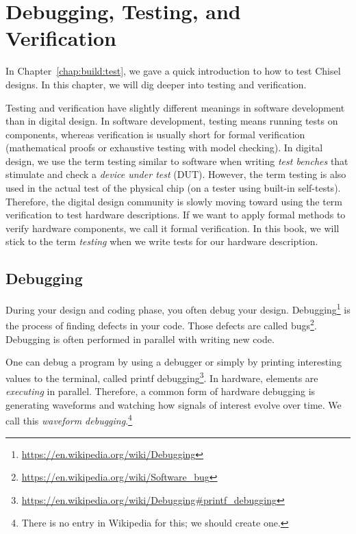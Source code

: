 \documentclass[%
    10pt,
    headinclude, footexclude,
    openright, %
    notitlepage,
    cleardoubleempty,
    headsepline,
    pointlessnumbers,
    bibtotoc, idxtotoc,
    ]{scrbook}
\newcommand{\myref}[2]{\href{#1}{#2}}
\renewcommand{\myref}[2]{{#2}{\footnote{\url{#1}}}}
\begin{document}
\chapter{Debugging, Testing, and Verification}
\label{chap:testing}



In Chapter~\ref{chap:build:test}, we gave a quick introduction to how to test
Chisel designs. In this chapter, we will dig deeper into testing and
verification.

Testing and verification have slightly different meanings in software development
than in digital design. In software development, testing means running tests on components,
whereas verification is usually short for formal verification (mathematical proofs or exhaustive testing
with model checking). In digital design, we use the term testing similar to software when writing
\emph{test benches} that stimulate and check a \emph{device under test} (DUT). However, the term testing
is also used in the actual test of the physical chip (on a tester using built-in self-tests).
Therefore, the digital design community is slowly moving toward using the term verification to
test hardware descriptions. If we want to apply formal methods to verify hardware
components, we call it formal verification. In this book, we will stick to the term \emph{testing}
when we write tests for our hardware description.

\section{Debugging}

During your design and coding phase, you often debug your design.
\myref{https://en.wikipedia.org/wiki/Debugging}{Debugging} is the process of
finding defects in your code. Those defects are called
\myref{https://en.wikipedia.org/wiki/Software_bug}{bugs}.
Debugging is often performed in parallel with writing new code.

One can debug a program by using a debugger or simply by printing interesting
values to the terminal, called \myref{https://en.wikipedia.org/wiki/Debugging\#printf\_debugging}{printf debugging}.
In hardware, elements are \emph{executing} in parallel. Therefore, a common form of hardware
debugging is generating waveforms and watching how signals of interest evolve over time.
We call this \emph{waveform debugging}.\footnote{There is no entry in Wikipedia for this;
we should create one.}
\end{document}
